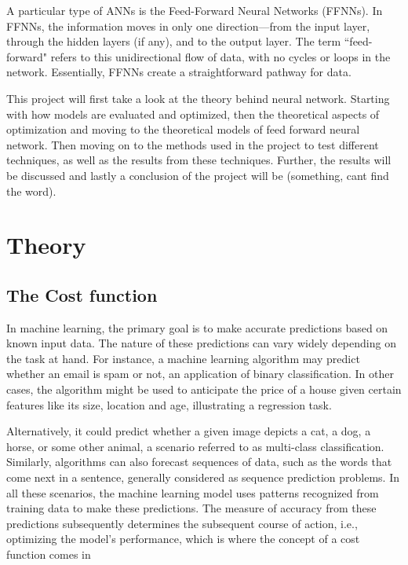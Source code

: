 \documentclass{article}
\theoremstyle{definition}
\begin{document}
A particular type of ANNs is the Feed-Forward Neural Networks (FFNNs). In FFNNs, the information moves in only one direction—from the input layer, through the hidden layers (if any), and to the output layer. The term ``feed-forward" refers to this unidirectional flow of data, with no cycles or loops in the network. Essentially, FFNNs create a straightforward pathway for data.

This project will first take a look at the theory behind neural network. Starting with how models are evaluated and optimized, then the theoretical aspects of optimization and moving to the theoretical models of feed forward neural network. Then moving on to the methods used in the project to test different techniques, as well as the results from these techniques. Further, the results will be discussed and lastly a conclusion of the project will be (something, cant find the word).

\newpage

\section{Theory}

\subsection{The Cost function}
In machine learning, the primary goal is to make accurate predictions based on known input data. The nature of these predictions can vary widely depending on the task at hand. For instance, a machine learning algorithm may predict whether an email is spam or not, an application of binary classification. In other cases, the algorithm might be used to anticipate the price of a house given certain features like its size, location and age, illustrating a regression task.

Alternatively, it could predict whether a given image depicts a cat, a dog, a horse, or some other animal, a scenario referred to as multi-class classification. Similarly, algorithms can also forecast sequences of data, such as the words that come next in a sentence, generally considered as sequence prediction problems. In all these scenarios, the machine learning model uses patterns recognized from training data to make these predictions. The measure of accuracy from these predictions subsequently determines the subsequent course of action, i.e., optimizing the model's performance, which is where the concept of a cost function comes in
\end{document}
